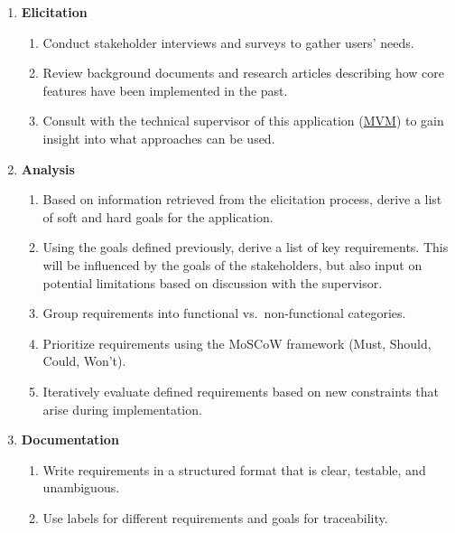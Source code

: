 \documentclass[12pt]{article}
\theoremstyle{definition}
\begin{document}
\begin{enumerate}
    \item \textbf{Elicitation}
    \begin{enumerate}
        \item Conduct stakeholder interviews and surveys to gather users' needs.

        \item Review background documents and research articles describing how
        core features have been implemented in the past.

        \item Consult with the technical supervisor of this application
        (\hyperref[itm:domain-experts]{MVM}) to gain insight into what
        approaches can be used. 
    \end{enumerate}

    \item \textbf{Analysis}
    \begin{enumerate}
        \item Based on information retrieved from the elicitation process,
        derive a list of soft and hard goals for the application.

        \item Using the goals defined previously, derive a list of key
        requirements. This will be influenced by the goals of the stakeholders,
        but also input on potential limitations based on discussion with the
        supervisor.

        \item Group requirements into functional vs.\ non-functional categories.

        \item Prioritize requirements using the MoSCoW framework (Must, Should,
        Could, Won't).

        \item Iteratively evaluate defined requirements based on new constraints
        that arise during implementation. 
    \end{enumerate}

    \item \textbf{Documentation}
    \begin{enumerate}
        \item Write requirements in a structured format that is clear, testable,
        and unambiguous.

        \item Use labels for different requirements and goals for traceability. 
    \end{enumerate}


\end{enumerate}
\end{document}
